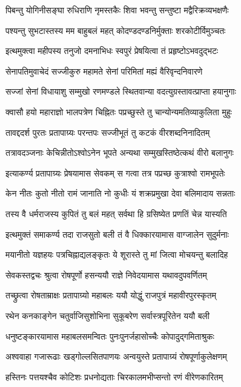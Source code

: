 \twolineshloka
{पिबन्तु योगिनीसङ्घा रुधिराणि नृमस्तकैः}
{शिवा भवन्तु सन्तुष्टा मद्वैरिक्रव्यभक्षणैः}%

\twolineshloka
{पश्यन्तु सुभटास्तस्य मम बाहुबलं महत्}
{कोदण्डदण्डनिर्मुक्ताः शरकोटीर्विमुञ्चतः}%

\twolineshloka
{इत्थमुक्त्वा महीपस्य तनुजो दमनाभिधः}
{स्वपुरं प्रेषयित्वा तं प्रहृष्टोऽभवदुद्भटः}%

\twolineshloka
{सेनापतिमुवाचेदं सज्जीकुरु महामते}
{सेनां परिमितां मह्यं वैरिवृन्दनिवारणे}%

\twolineshloka
{सज्जां सेनां विधायाशु सम्मुखो रणमण्डले}
{स्थितवान्या वदत्युग्रस्तावत्प्राप्ता हयानुगाः}%

\twolineshloka
{क्वासौ हयो महाराज्ञो भालपत्रेण चिह्नितः}
{पप्रच्छुस्ते तु चान्योन्यमतिव्याकुलिता मुहुः}%

\twolineshloka
{तावद्ददर्श पुरतः प्रतापाग्र्यः परन्तपः}
{सज्जीभूतं तु कटकं वीरशब्दनिनादितम्}%

\twolineshloka
{तत्रावदञ्जनाः केचिन्नीतोऽश्वोऽनेन भूपते}
{अन्यथा सम्मुखस्तिष्ठेत्कथं वीरो बलानुगः}%

\twolineshloka
{इत्याकर्ण्य प्रतापाग्र्यः प्रेषयामास सेवकम्}
{स गत्वा तत्र पप्रच्छ कुत्राश्वो रामभूपतेः}%

\twolineshloka
{केन नीतः कुतो नीतो रामं जानाति नो कुधीः}
{यं शक्रप्रमुखा देवा बलिमादाय सन्नताः}%

\twolineshloka
{तस्य वै धर्मराजस्य कुपितं तु बलं महत्}
{सर्वथा हि ग्रसिष्येत प्रणतिं चेन्न यास्यति}%

\twolineshloka
{इत्थमुक्तं समाकर्ण्य तदा राजसुतो बली}
{तं वै धिक्कारयामास वाग्जालेन सुदुर्मनाः}%

\twolineshloka
{मयानीतो यज्ञहयः पत्रचिह्नाद्यलङ्कृतः}
{ये शूरास्ते तु मां जित्वा मोचयन्तु बलादिह}%

\twolineshloka
{सेवकस्तद्वचः श्रुत्वा रोषपूर्णो हसन्ययौ}
{राज्ञे निवेदयामास यथावदुपवर्णितम्}%

\twolineshloka
{तच्छ्रुत्वा रोषताम्राक्षः प्रतापाग्र्यो महाबलः}
{ययौ योद्धुं राजपुत्रं महावीरपुरस्कृतम्}%

\twolineshloka
{रथेन कनकाङ्गेन चतुर्वाजिसुशोभिना}
{सुकूबरेण सर्वास्त्रपूरितेन ययौ बली}%

\twolineshloka
{धनुष्टङ्कारयामास महाबलसमन्वितः}
{पुनःपुनर्जहासोच्चैः कोपादुद्गमिताश्रुकः}%

\twolineshloka
{अश्ववाहा गजारूढाः खड्गोल्लसितपाणयः}
{अन्वयुस्ते प्रतापाग्र्यं रोषपूर्णाकुलेक्षणम्}%

\twolineshloka
{हस्तिनः पत्तयश्चैव कोटिशः प्रधनोद्यताः}
{चिरकालमभीप्सन्तो रणं वीरेणकारितम्}%

